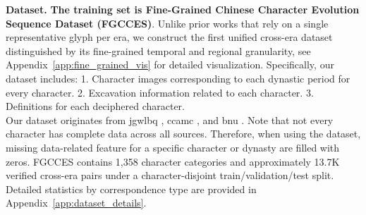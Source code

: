 \documentclass{article}
\begin{document}
\textbf{Dataset.} \textbf{The training set is Fine-Grained Chinese Character Evolution Sequence Dataset (FGCCES)}. Unlike prior works that rely on a single representative glyph per era, we construct the first unified cross-era dataset distinguished by its fine-grained temporal and regional granularity, see Appendix~\ref{app:fine_grained_vis} for detailed visualization. 
Specifically, our dataset includes:
1. Character images corresponding to each dynastic period for every character.
2. Excavation information related to each character.
3. Definitions for each deciphered character.\\
Our dataset originates from jgwlbq \cite{lbqjqw}, ccamc \cite{ccamc}, and bnu \cite{bnu}. Note that not every character has complete data across all sources. Therefore, when using the dataset, missing data-related feature for a specific character or dynasty are filled with zeros. FGCCES contains 1,358 character categories and approximately 13.7K verified cross-era pairs under a character-disjoint train/validation/test split. Detailed statistics by correspondence type are provided in Appendix~\ref{app:dataset_details}.
\end{document}
